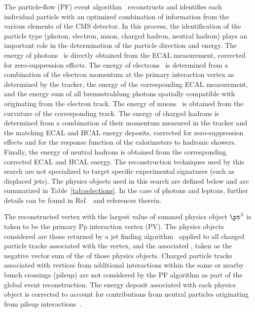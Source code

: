 The particle-flow (PF) event algorithm~\cite{CMS-PRF-14-001}
reconstructs and identifies each individual particle with an optimized
combination of information from the various elements of the CMS
detector. In this process, the identification of the particle type
(photon, electron, muon, charged hadron, neutral hadron) plays an
important role in the determination of the particle direction and
energy. The energy of photons~\cite{Khachatryan:2015iwa} is directly
obtained from the ECAL measurement, corrected for zero-suppression
effects. The energy of electrons~\cite{Khachatryan:2015hwa} is
determined from a combination of the electron momentum at the primary
interaction vertex as determined by the tracker, the energy of the
corresponding ECAL measurement, and the energy sum of all
bremsstrahlung photons spatially compatible with originating from the
electron track. The energy of muons~\cite{Chatrchyan:2012xi} is
obtained from the curvature of the corresponding track. The energy of
charged hadrons is determined from a combination of their momentum
measured in the tracker and the matching ECAL and HCAL energy
deposits, corrected for zero-suppression effects and for the response
function of the calorimeters to hadronic showers. Finally, the energy
of neutral hadrons is obtained from the corresponding corrected ECAL
and HCAL energy. The reconstruction techniques used by this search are
not specialized to target specific experimental signatures (such as
displaced jets). The physics objects used in this search are defined
below and are summarized in Table~\ref{tab:selections}. In the case of
photons and leptons, further details can be found in
Ref.~\cite{Khachatryan:2016dvc} and references therein.

The reconstructed vertex with the largest value of summed physics
object $\pt^2$ is taken to be the primary {Pp\Pp} interaction vertex
(PV). The physics objects considered are those returned by a jet
finding algorithm~\cite{Cacciari:2008gp, Cacciari:2011ma} applied to
all charged particle tracks associated with the vertex, and the
associated \ptmiss, taken as the negative vector sum of the \pt of
those physics objects. Charged particle tracks associated with
vertices from additional {\Pp\Pp} interactions within the same or
nearby bunch crossings (pileup) are not considered by the PF algorithm
as part of the global event reconstruction. The energy deposit
associated with each physics object %
is corrected to account for contributions from neutral particles
originating from pileup interactions~\cite{Cacciari:2007fd}.

